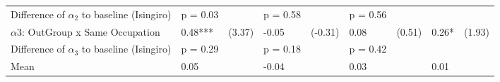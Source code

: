 \begin{tabular}{l*{8}{l}}
Difference of $\alpha_2$ to baseline (Isingiro) & p = 0.03 & & p = 0.58 & & p = 0.56 & & &  \\ $\alpha3$: OutGroup x Same Occupation&     0.48***&   (3.37)&    -0.05   &  (-0.31)&     0.08   &   (0.51)&     0.26*  &   (1.93)\\
 
Difference of $\alpha_3$ to baseline (Isingiro) & p = 0.29 & & p = 0.18 & & p = 0.42 & & & \\ Mean            &     0.05&         &    -0.04&         &     0.03&         &     0.01&         \\
 
\bottomrule  \end{tabular}  
